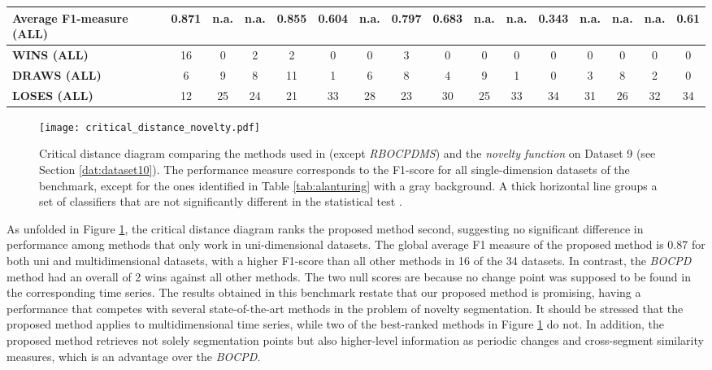 \begin{table}
{\begin{tabular}{l|c|cccccccccccccc}
    \midrule

    \textbf{Average F1-measure (ALL)} & \textbf{0.871} & n.a. & n.a. & 0.855 & 0.604 & n.a. & 0.797 & 0.683 & n.a. & n.a. & 0.343 & n.a. & n.a. & n.a. & 0.61\\

    \midrule
    
	\textbf{WINS (ALL)} & 16 & 0 & 2 & 2 & 0 & 0 & 3 & 0 & 0 & 0 & 0 & 0 & 0 & 0 & 0\\
    
    \textbf{DRAWS (ALL)} & 6 & 9 & 8 & 11 & 1 & 6 & 8 & 4 & 9 & 1 & 0 & 3 & 8 & 2 & 0\\
    \textbf{LOSES (ALL)} & 12 & 25 & 24 & 21 & 33 & 28 & 23 & 30 & 25 & 33 & 34 & 31 & 26 & 32 & 34\\
    \bottomrule
    \end{tabular}}
\end{table}

\begin{figure}
    \centering
    \texttt{[image: critical\_distance\_novelty.pdf]}
    \caption{Critical distance diagram comparing the methods used in \cite{cpd_alan} (except \textit{RBOCPDMS}) and the \textit{novelty function} on Dataset 9 (see Section \ref{dat:dataset10}). The performance measure corresponds to the F1-score for all single-dimension datasets of the benchmark, except for the ones identified in Table \ref{tab:alanturing} with a gray background. A thick horizontal line groups a set of classifiers that are not significantly different in the statistical test \cite{critical_dif}.}
    \label{fig:cdd_alant}
\end{figure}

As unfolded in Figure \ref{fig:cdd_alant}, the critical distance diagram ranks the proposed method second, suggesting no significant difference in performance among methods that only work in uni-dimensional datasets. The global average F1 measure of the proposed method is 0.87 for both uni and multidimensional datasets, with a higher F1-score than all other methods in 16 of the 34 datasets. In contrast, the \textit{BOCPD} method had an overall of 2 wins against all other methods. 
The two null scores are because no change point was supposed to be found in the corresponding time series. The results obtained in this benchmark restate that our proposed method is promising, having a performance that competes with several state-of-the-art methods in the problem of novelty segmentation. It should be stressed that the proposed method applies to multidimensional time series, while two of the best-ranked methods in Figure \ref{fig:cdd_alant} do not. In addition, the proposed method retrieves not solely segmentation points but also higher-level information as periodic changes and cross-segment similarity measures, which is an advantage over the \textit{BOCPD}.

